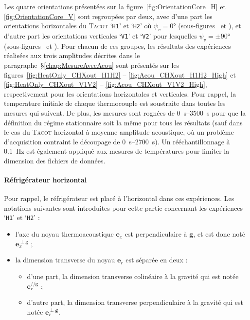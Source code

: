 Les quatre orientations présentées sur la figure~\ref{fig:OrientationCore_H} et \ref{fig:OrientationCore_V} sont regroupées par deux, avec d'une part les orientations horizontales du \textsc{Tacot} `\texttt{H1}' et `\texttt{H2}' où $\psi_v=\ang{0}$ (sous-figures~ et ), et d'autre part les orientations verticales `\texttt{V1}' et `\texttt{V2}' pour lesquelles $\psi_v=\pm\ang{90}$ (sous-figures~ et ). Pour chacun de ces groupes, les résultats des expériences réalisées aux trois amplitudes décrites dans le paragraphe~§\ref{chap:MesureAvecAcou} sont présentés sur les figures~\ref{fig:HeatOnly_CHXout_H1H2} -- \ref{fig:Acou_CHXout_H1H2_High} et \ref{fig:HeatOnly_CHXout_V1V2} -- \ref{fig:Acou_CHXout_V1V2_High}, respectivement pour les orientations horizontales et verticales. Pour rappel, la temperature initiale de chaque thermocouple est soustraite dans toutes les mesures qui suivent. De plus, les mesures sont rognées de \qtyrange{0}{3500}{\second} pour que la définition du régime stationnaire soit la même pour tous les résultats (sauf dans le cas du \textsc{Tacot} horizontal à moyenne amplitude acoustique, où un problème d'acquisition contraint le découpage de \qtyrange{0}{2700}{\second}). Un rééchantillonnage à \qty{.1}{\hertz} est également appliqué aux mesures de températures pour limiter la dimension des fichiers de données.

\paragraph{Réfrigérateur horizontal}
Pour rappel, le réfrigérateur est placé à l'horizontal dans ces expériences. Les notations suivantes sont introduites pour cette partie concernant les expériences `\texttt{H1}' et `\texttt{H2}' :

\begin{itemize}
\item l'axe du noyau thermoacoustique $\mathbf e_x$ est perpendiculaire à $\mathbf g$, et est donc noté $\mathbf e_x^{\perp \mathbf g}$ ;
\item la dimension transverse du noyau $\mathbf e_r$ est séparée en deux :
	\begin{itemize}
	\item d'une part, la dimension transverse colinéaire à la gravité qui est notée $\mathbf e_r^{// \mathbf g}$ ;
	\item d'autre part, la dimension transverse perpendiculaire à la gravité qui est notée $\mathbf e_r^{\perp \mathbf g}$.
	\end{itemize}
\end{itemize}

